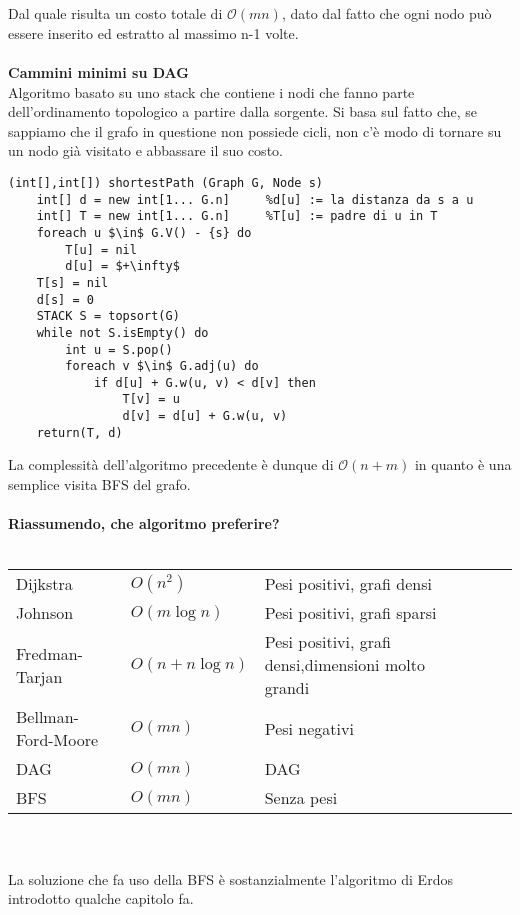 \documentclass[../cheatSheetAlgoritmi.tex]{subfiles}
\begin{document}
\\\\
Dal quale risulta un costo totale di $\mathcal{O}(mn)$, dato dal fatto che ogni nodo può essere inserito ed estratto al massimo n-1 volte. \\\\
\textbf{Cammini minimi su DAG} \\
Algoritmo basato su uno stack che contiene i nodi che fanno parte dell'ordinamento topologico a partire dalla sorgente. Si basa sul fatto che, se sappiamo che il grafo in questione non possiede cicli, non c’è modo di tornare su un nodo già visitato e abbassare il suo costo.
\begin{lstlisting}[caption=Algoritmo per i DAG: cammini minimi a sorgente singola]
(int[],int[]) shortestPath (Graph G, Node s)
	int[] d = new int[1... G.n]		%d[u] := la distanza da s a u 
	int[] T = new int[1... G.n]		%T[u] := padre di u in T
	foreach u $\in$ G.V() - {s} do
		T[u] = nil
		d[u] = $+\infty$
	T[s] = nil
	d[s] = 0
	STACK S = topsort(G)
	while not S.isEmpty() do 
		int u = S.pop()
		foreach v $\in$ G.adj(u) do
			if d[u] + G.w(u, v) < d[v] then 
				T[v] = u 
				d[v] = d[u] + G.w(u, v)
	return(T, d)
\end{lstlisting}
La complessità dell'algoritmo precedente è dunque di $\mathcal{O}(n + m)$ in quanto è una semplice visita BFS del grafo. \\\\
\textbf{Riassumendo, che algoritmo preferire?} \\\\
\begin{tabular}{lllll}
Dijkstra       &  $O(n^2)$ & Pesi positivi, grafi densi &  \\
Johnson        &  $O(m \log n)$ &  Pesi positivi, grafi sparsi &  \\
Fredman-Tarjan &  $O(n + n \log n)$ & Pesi positivi, grafi densi,dimensioni molto grandi  & \\
Bellman-Ford-Moore &  $O(mn)$ & Pesi negativi &  \\
DAG               & $O(mn)$ & DAG  &  \\
BFS	 & $O(mn)$ & Senza pesi &  \\
\end{tabular}\\\\
La soluzione che fa uso della BFS è sostanzialmente l'algoritmo di Erdos introdotto qualche capitolo fa.
\end{document}
